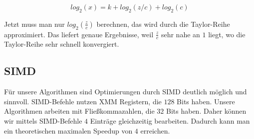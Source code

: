 \[log_2(x) = k + log_2(z/c) + log_2(c)\]

Jetzt muss man nur $log_2(\frac{z}{c})$ berechnen, das wird durch die Taylor-Reihe approximiert. Das liefert genaue Ergebnisse, weil $\frac{z}{c}$ sehr nahe an $1$ liegt, wo die Taylor-Reihe sehr schnell konvergiert. 




\subsection{SIMD}
Für unsere Algorithmen sind Optimierungen durch SIMD deutlich möglich und sinnvoll. SIMD-Befehle nutzen XMM Registern, die $128$ Bits haben. Unsere Algorithmen arbeiten mit Fließkommazahlen, die $32$ Bits haben. Daher können wir mittels SIMD-Befehle $4$ Einträge gleichzeitig bearbeiten. Dadurch kann man ein theoretischen maximalen Speedup von $4$ erreichen.



